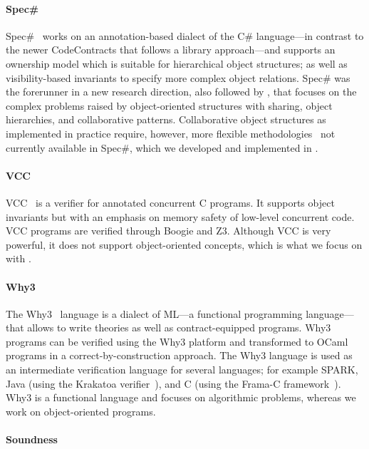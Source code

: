 \paragraph{Spec\#}

Spec\#~\cite{BARNETT05,BARNETT11} works on an annotation-based dialect of the C\# language---in contrast to the newer CodeContracts that follows a library approach---and supports an ownership model which is suitable for hierarchical object structures; as well as visibility-based invariants to specify more complex object relations.
Spec\# was the forerunner in a new research direction, also followed by \AutoProof, that focuses on the complex problems raised by object-oriented structures with sharing, object hierarchies, and collaborative patterns.
Collaborative object structures as implemented in practice require, however, more flexible methodologies~\cite{POLIKARPOVA14} not currently available in Spec\#, which we developed and implemented in \AutoProof.

\paragraph{VCC}

VCC~\cite{COHEN09} is a verifier for annotated concurrent C programs.
It supports object invariants but with an emphasis on memory safety of low-level concurrent code.
VCC programs are verified through Boogie and Z3.
Although VCC is very powerful, it does not support object-oriented concepts, which is what we focus on with \AutoProof.

\paragraph{Why3}

The Why3~\cite{FILLIATRE13} language is a dialect of ML---a functional programming language---that allows to write theories as well as contract-equipped programs.
Why3 programs can be verified using the Why3 platform and transformed to OCaml programs in a correct-by-construction approach.
The Why3 language is used as an intermediate verification language for several languages; for example SPARK, Java (using the Krakatoa verifier~\cite{FILLIATRE07}), and C (using the Frama-C framework~\cite{CUOQ12}).
Why3 is a functional language and focuses on algorithmic problems, whereas we work on object-oriented programs.


\paragraph{Soundness}

